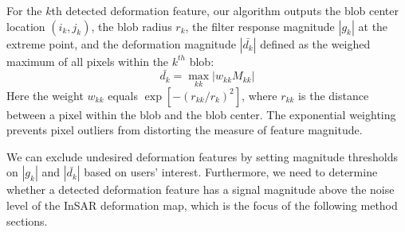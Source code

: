 \documentclass{utexasthesis}
\begin{document}
For the $k$th detected deformation feature, our algorithm outputs the blob center location $(i_k, j_k)$, the blob radius $ r_k$, the filter response magnitude $|g_k|$ at the extreme point, and the deformation magnitude $|\bar{d_k}|$ defined as the weighed maximum of all pixels within the $k^{th}$ blob:
\begin{equation}
\bar{d_k} = \max_{kk} |w_{kk} M_{kk} | 
\end{equation}
Here the weight $w_{kk}$ equals $\exp\left[-(r_{kk} / r_k)^2\right]$, where $r_{kk}$ is the distance between a pixel within the blob and the blob center. The exponential weighting prevents pixel outliers from distorting the measure of feature magnitude. 

We can exclude undesired deformation features by setting magnitude thresholds on $|g_k|$ and $|\bar{d_k}|$ based on users' interest. Furthermore, we need to determine whether a detected deformation feature has a signal magnitude above the noise level of the InSAR deformation map, which is the focus of the following method sections. 
\end{document}
